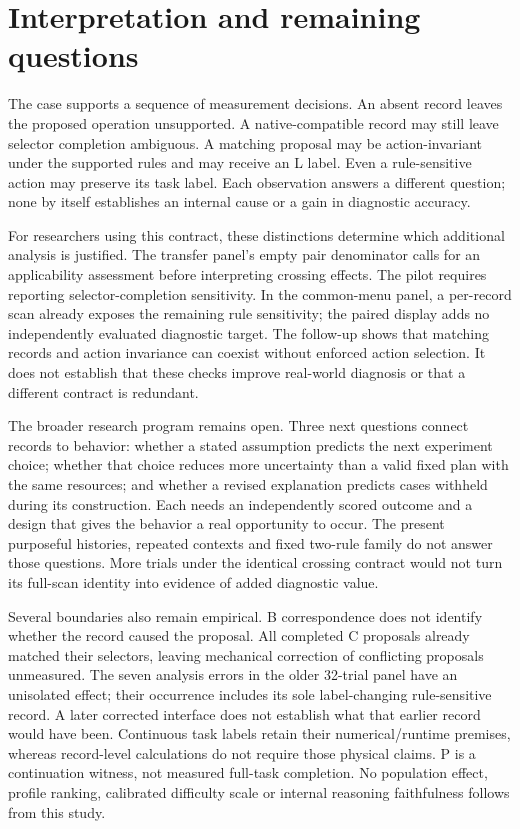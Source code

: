 \section{Interpretation and remaining questions}
The case supports a sequence of measurement decisions. An absent record
leaves the proposed operation unsupported. A native-compatible record may
still leave selector completion ambiguous. A matching proposal may be
action-invariant under the supported rules and may receive an L label.
Even a rule-sensitive action may preserve its task label. Each observation
answers a different question; none by itself establishes an internal cause
or a gain in diagnostic accuracy.

For researchers using this contract, these distinctions determine which
additional analysis is justified. The transfer panel's empty pair denominator
calls for an applicability assessment before interpreting crossing effects.
The pilot requires reporting selector-completion sensitivity. In the
common-menu panel, a per-record scan already exposes the remaining rule
sensitivity; the paired display adds no independently evaluated diagnostic
target. The follow-up shows that matching records and action invariance can
coexist without enforced action selection. It does not establish that these
checks improve real-world diagnosis or that a different contract is redundant.

The broader research program remains open. Three next questions connect
records to behavior: whether a stated assumption predicts the next experiment
choice; whether that choice reduces more uncertainty than a valid fixed plan
with the same resources; and whether a revised explanation predicts cases
withheld during its construction. Each needs an independently scored outcome
and a design that gives the behavior a real opportunity to occur. The present
purposeful histories, repeated contexts and fixed two-rule family do not answer
those questions. More trials under the identical crossing contract would not
turn its full-scan identity into evidence of added diagnostic value.

Several boundaries also remain empirical. B correspondence does not identify
whether the record caused the proposal. All completed C proposals already
matched their selectors, leaving mechanical correction of conflicting
proposals unmeasured. The seven analysis errors in the older 32-trial panel
have an unisolated effect; their occurrence includes its sole label-changing
rule-sensitive record. A later corrected interface does not establish what
that earlier record would have been. Continuous task labels retain their
numerical/runtime premises, whereas record-level calculations do not require
those physical claims. P is a continuation witness, not measured full-task
completion. No population effect, profile ranking, calibrated difficulty scale
or internal reasoning faithfulness follows from this study.

